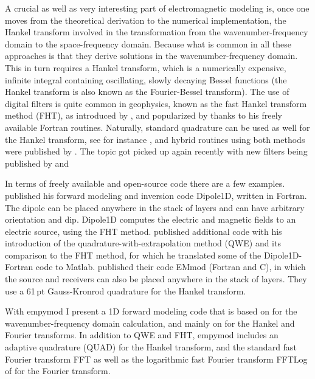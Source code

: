 \documentclass[manuscript,revised]{geophysics}
\begin{document}
A crucial as well as very interesting part of electromagnetic modeling is, once
one moves from the theoretical derivation to the numerical implementation, the
Hankel transform involved in the transformation from the
wave\-num\-ber-fre\-que\-ncy domain to the space-frequency domain. Because what
is common in all these approaches is that they derive solutions in the
wavenumber-frequency domain. This in turn requires a Hankel transform, which is
a numerically expensive, infinite integral containing oscillating, slowly
decaying Bessel functions (the Hankel transform is also known as the
Fourier-Bessel transform). The use of digital filters is quite common in
geophysics, known as the fast Hankel transform method (FHT), as introduced by
\cite{GP.71.Gosh}, and popularized by \cite{TRP.75.Anderson, GEO.79.Anderson,
TMS.82.Anderson} thanks to his freely available Fortran routines. Naturally,
standard quadrature can be used as well for the Hankel transform, see for
instance \cite{GEO.83.Chave}, and hybrid routines using both methods were
published by \cite{GEO.84.Anderson, GEO.89.Anderson}. The topic got picked up
again recently with new filters being published by \cite{GP.07.Kong} and
\cite{GEO.09.Key, GEO.12.Key}

In terms of freely available and open-source code there are a few examples.
\cite{GEO.09.Key} published his forward modeling and inversion code Dipole1D,
written in Fortran. The dipole can be placed anywhere in the stack of layers
and can have arbitrary orientation and dip. Dipole1D computes the electric and
magnetic fields to an electric source, using the FHT method. \cite{GEO.12.Key}
published additional code with his introduction of the
qua\-dra\-ture-with-ex\-tra\-po\-la\-tion method (QWE) and its comparison to
the FHT method, for which he translated some of the Dipole1D-Fortran code to
Matlab. \cite{GEO.15.Hunziker} published their code EMmod (Fortran and C), in
which the source and receivers can also be placed anywhere in the stack of
layers. They use a 61\,pt Gauss-Kronrod quadrature for the Hankel transform.

With empymod I present a 1D forward modeling code that is based on
\cite{GEO.15.Hunziker} for the wavenumber-frequency domain calculation, and
mainly on \cite{GEO.12.Key} for the Hankel and Fourier transforms. In addition
to QWE and FHT, empymod includes an adaptive quadrature (QUAD) for the Hankel
transform, and the standard fast Fourier transform FFT as well as the
logarithmic fast Fourier transform FFTLog of \cite{RAS.00.Hamilton} for the
Fourier transform.
\end{document}
